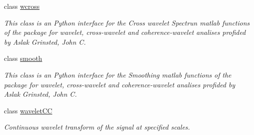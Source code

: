 \begin{DoxyCompactItemize}
class \hyperlink{classprojects_1_1piwavelet_1_1piwavelet_1_1piwavelet_1_1wcross}{wcross}
\begin{DoxyCompactList}\small\item\em This class is an Python interface for the Cross wavelet Spectrun matlab functions of the package for wavelet, cross-\/wavelet and coherence-\/wavelet analises profided by Aslak Grinsted, John C. \end{DoxyCompactList}\item 
class \hyperlink{classprojects_1_1piwavelet_1_1piwavelet_1_1piwavelet_1_1smooth}{smooth}
\begin{DoxyCompactList}\small\item\em This class is an Python interface for the Smoothing matlab functions of the package for wavelet, cross-\/wavelet and coherence-\/wavelet analises profided by Aslak Grinsted, John C. \end{DoxyCompactList}\item 
class \hyperlink{classprojects_1_1piwavelet_1_1piwavelet_1_1piwavelet_1_1waveletCC}{wavelet\-C\-C}
\begin{DoxyCompactList}\small\item\em Continuous wavelet transform of the signal at specified scales. \end{DoxyCompactList}\end{DoxyCompactItemize}
